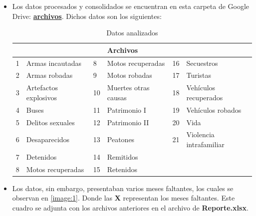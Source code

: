 \begin{itemize}
	\item Los datos procesados y consolidados se encuentran en esta carpeta de Google Drive:\textbf{
	\href{https://drive.google.com/drive/folders/1wrUz2HQ4ot9iP2RcIvtUg_z284M36j6b?usp=sharing}{archivos}}. Dichos datos son los siguientes: 
	\begin{table}[H]
		\centering
		\caption{Datos analizados}
		\label{tab:datos}
		\begin{tabular}{@{}llllll@{}}
			&                       &                         & Archivos             &                         &                         \\ \midrule
			\multicolumn{1}{l|}{1} & Armas incautadas      & \multicolumn{1}{l|}{8}  & Motos recuperadas    & \multicolumn{1}{l|}{16} & Secuestros              \\
			\multicolumn{1}{l|}{2} & Armas robadas         & \multicolumn{1}{l|}{9}  & Motos robadas        & \multicolumn{1}{l|}{17} & Turistas                \\
			\multicolumn{1}{l|}{3} & Artefactos explosivos & \multicolumn{1}{l|}{10} & Muertes otras causas & \multicolumn{1}{l|}{18} & Vehículos recuperados   \\
			\multicolumn{1}{l|}{4} & Buses                 & \multicolumn{1}{l|}{11} & Patrimonio I         & \multicolumn{1}{l|}{19} & Vehículos robados       \\
			\multicolumn{1}{l|}{5} & Delitos sexuales      & \multicolumn{1}{l|}{12} & Patrimonio II        & \multicolumn{1}{l|}{20} & Vida                    \\
			\multicolumn{1}{l|}{6} & Desaparecidos         & \multicolumn{1}{l|}{13} & Peatones             & \multicolumn{1}{l|}{21} & Violencia intrafamiliar \\
			\multicolumn{1}{l|}{7} & Detenidos             & \multicolumn{1}{l|}{14} & Remitidos            & \multicolumn{1}{l|}{}   &                         \\
			\multicolumn{1}{l|}{8} & Motos recuperadas     & \multicolumn{1}{l|}{15} & Retenidos            & \multicolumn{1}{l|}{}   &                        
		\end{tabular}
	\end{table}
	\item Los datos, sin embargo, presentaban varios meses faltantes, los cuales se observan en \ref{image:1}. Donde las \textbf{X} representan los meses faltantes. Este cuadro se adjunta con los archivos anteriores en el archivo de \textbf{Reporte.xlsx}. 
	

\end{itemize}
